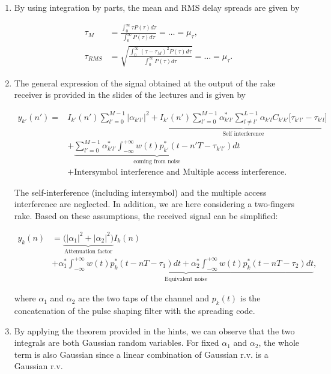 \documentclass [a4paper, 11pt] {article}
\begin{document}
    \begin{solution}
        \begin{enumerate}
    \item By using integration by parts, the mean and RMS delay spreads are given by
    
\begin{align}
        \tau_M &= \frac{\int_0^\infty \tau P(\tau) d\tau}{\int_0^\infty P(\tau) d\tau} = \hdots = \mu_{\tau}, \\
        \tau_{RMS} & = \sqrt{\frac{\int_0^\infty (\tau - \tau_M)^2 P(\tau) d\tau}{\int_0^\infty P(\tau) d\tau}} = \hdots = \mu_{\tau}.
\end{align}

\item The general expression of the signal obtained at the output of the rake receiver is provided in the slides of the lectures and is given by 

\begin{align}
    y_{k'}(n') =& I_{k'}(n') \sum_{l'=0}^{M-1}|\alpha_{k'l'}|^2 +  \underbrace{I_{k'}(n')\sum_{l'=0}^{M-1}\alpha^*_{k'l'}\sum_{l\neq l'}^{L-1}\alpha_{k'l}C_{k'k'}\big[\tau_{k'l'}-\tau_{k'l} \big]}_{\text{Self interference}}\\ 
    &+ \underbrace{\sum_{l'=0}^{M-1} \alpha^*_{k'l'} \int_{-\infty}^{+\infty}w(t)p^*_{k'}(t-n'T-\tau_{k'l'})dt}_{\text{coming from noise}}\nonumber\\
    &+ \text{Intersymbol interference and Multiple access interference}. \nonumber
\end{align}

The self-interference (including intersymbol) and the multiple access interference are neglected. In addition, we are here considering a two-fingers rake. Based on these assumptions, the received signal can be simplified:

\begin{align}
    y_k(n) &= \underbrace{\Big(|\alpha_1|^2 + |\alpha_2|^2 \Big)}_{\text{Attenuation factor}} I_k(n)\\
    &+ \underbrace{\alpha^*_1 \int_{-\infty}^{+\infty} w(t)p_k^*(t-nT-\tau_{1})dt + \alpha^*_2 \int_{-\infty}^{+\infty} w(t)p_k^*(t-nT-\tau_{2})dt}_{\text{Equivalent noise}}, \nonumber
\end{align}

where $\alpha_1$ and $\alpha_2$ are the two taps of the channel and $p_k(t)$ is the concatenation of the pulse shaping filter with the spreading code. 

\item By applying the theorem provided in the hints, we can observe that the two integrals are both Gaussian random variables. For fixed $\alpha_1$ and $\alpha_2$, the whole term is also Gaussian since a linear combination of Gaussian r.v. is a Gaussian r.v.


\end{enumerate}
\end{solution}
\end{document}

